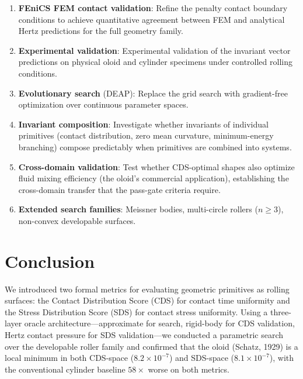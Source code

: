 \documentclass[11pt,a4paper]{article}
\begin{document}
\begin{enumerate}[leftmargin=*]
  \item \textbf{FEniCS FEM contact validation}: Refine the penalty
    contact boundary conditions to achieve quantitative agreement
    between FEM and analytical Hertz predictions for the full
    geometry family.
  \item \textbf{Experimental validation}: Experimental validation of the invariant vector predictions on physical oloid and cylinder specimens under controlled rolling conditions.
  \item \textbf{Evolutionary search} (DEAP): Replace the grid search
    with gradient-free optimization over continuous parameter spaces.
  \item \textbf{Invariant composition}: Investigate whether invariants
    of individual primitives (contact distribution, zero mean curvature,
    minimum-energy branching) compose predictably when primitives are
    combined into systems.
  \item \textbf{Cross-domain validation}: Test whether CDS-optimal
    shapes also optimize fluid mixing efficiency (the oloid's
    commercial application), establishing the cross-domain transfer
    that the pass-gate criteria require.
  \item \textbf{Extended search families}: Meissner bodies, multi-circle
    rollers ($n \geq 3$), non-convex developable surfaces.
\end{enumerate}


\section{Conclusion}

We introduced two formal metrics for evaluating geometric primitives
as rolling surfaces: the Contact Distribution Score (CDS) for contact
time uniformity and the Stress Distribution Score (SDS) for contact
stress uniformity. Using a three-layer oracle architecture---approximate
for search, rigid-body for CDS validation, Hertz contact pressure for
SDS validation---we conducted a parametric search over the developable
roller family and confirmed that the oloid (Schatz, 1929) is a local
minimum in both CDS-space ($8.2 \times 10^{-7}$) and SDS-space
($8.1 \times 10^{-7}$), with the conventional cylinder baseline
$58\times$ worse on both metrics.
\end{document}
